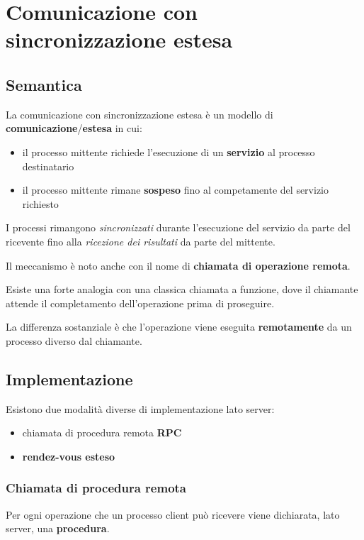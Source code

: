\chapter{Comunicazione con sincronizzazione estesa}

\section{Semantica}

La comunicazione con sincronizzazione estesa è un modello di \textbf{comunicazione}/\textbf{estesa} in cui:
\begin{itemize}
    \item il processo mittente richiede l'esecuzione di un \textbf{servizio} al processo destinatario
    \item il processo mittente rimane \textbf{sospeso} fino al competamente del servizio richiesto
\end{itemize}

I processi rimangono \textit{sincronizzati} durante l'esecuzione del servizio da parte del ricevente fino alla \textit{ricezione dei risultati} da parte del mittente.

Il meccanismo è noto anche con il nome di \textbf{chiamata di operazione remota}.

Esiste una forte analogia con una classica chiamata a funzione, dove il chiamante attende il completamento dell'operazione prima di proseguire.

La differenza sostanziale è che l'operazione viene eseguita \textbf{remotamente} da un processo diverso dal chiamante.


\section{Implementazione}

Esistono due modalità diverse di implementazione lato server:
\begin{itemize}
    \item chiamata di procedura remota \textbf{RPC}
    \item \textbf{rendez-vous esteso}
\end{itemize}

\subsection{Chiamata di procedura remota}

Per ogni operazione che un processo client può ricevere viene dichiarata, lato server, una \textbf{procedura}.

